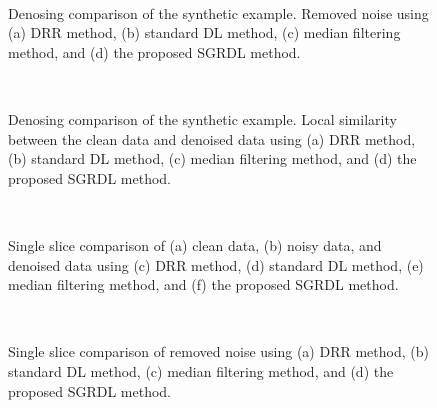 \begin{figure}[htb!]
\centering
{}
\\
\caption{Denosing comparison of the synthetic example. Removed noise using (a) DRR method, (b) standard DL method, (c) median filtering method, and (d) the proposed SGRDL method. }
\label{fig:syn-drr-n,syn-dl-n,syn-mf-n-0,syn-sgrdl-n-0}
\end{figure}

\begin{figure}[htb!]
\centering
{}
\\
\caption{Denosing comparison of the synthetic example. Local similarity between the clean data and denoised data using (a) DRR method, (b) standard DL method, (c) median filtering method, and (d) the proposed SGRDL method. }
\label{fig:syn-drr-s,syn-dl-s,syn-mf-s,syn-sgrdl-s}
\end{figure}

\begin{figure}[htb!]
\centering
{}
\\
\caption{Single slice comparison of (a) clean data, (b) noisy data, and denoised data using (c) DRR method, (d) standard DL method, (e) median filtering method, and (f) the proposed SGRDL method. }
\label{fig:syn-s-c,syn-s-n,syn-s-drr,syn-s-dl,syn-s-mf-0,syn-s-sgrdl-0}
\end{figure}


\begin{figure}[htb!]
\centering
{}
\\
\caption{Single slice comparison of removed noise using (a) DRR method, (b) standard DL method, (c) median filtering method, and (d) the proposed SGRDL method. }
\label{fig:syn-s-c,syn-s-n,syn-s-drr,syn-s-dl,syn-s-mf-0,syn-s-sgrdl}
\end{figure}



